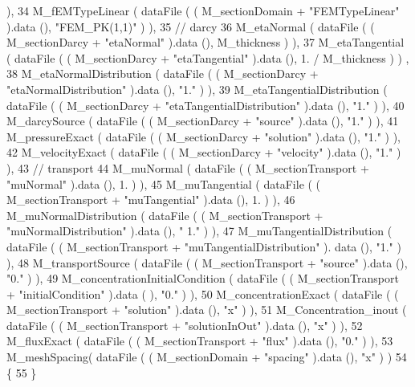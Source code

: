 \begin{DoxyCode}
       ),
34             M\_fEMTypeLinear ( dataFile ( ( M\_sectionDomain + \textcolor{stringliteral}{"FEMTypeLinear"} ).data (), \textcolor{stringliteral}{"FEM\_PK(1,1)"} ) ),
35             \textcolor{comment}{// darcy}
36             M\_etaNormal ( dataFile ( ( M\_sectionDarcy + \textcolor{stringliteral}{"etaNormal"} ).data (), M\_thickness ) ),
37             M\_etaTangential ( dataFile ( ( M\_sectionDarcy + \textcolor{stringliteral}{"etaTangential"} ).data (), 1. / M\_thickness ) )
      ,
38             M\_etaNormalDistribution ( dataFile ( ( M\_sectionDarcy + \textcolor{stringliteral}{"etaNormalDistribution"} ).data (), \textcolor{stringliteral}{"1."}
       ) ),
39             M\_etaTangentialDistribution ( dataFile ( ( M\_sectionDarcy + \textcolor{stringliteral}{"etaTangentialDistribution"} ).data 
      (), \textcolor{stringliteral}{"1."} ) ),
40             M\_darcySource ( dataFile ( ( M\_sectionDarcy + \textcolor{stringliteral}{"source"} ).data (), \textcolor{stringliteral}{"1."} ) ),
41             M\_pressureExact ( dataFile ( ( M\_sectionDarcy + \textcolor{stringliteral}{"solution"} ).data (), \textcolor{stringliteral}{"1."} ) ),
42             M\_velocityExact ( dataFile ( ( M\_sectionDarcy + \textcolor{stringliteral}{"velocity"} ).data (), \textcolor{stringliteral}{"1."} ) ),
43             \textcolor{comment}{// transport}
44             M\_muNormal ( dataFile ( ( M\_sectionTransport + \textcolor{stringliteral}{"muNormal"} ).data (), 1. ) ),
45             M\_muTangential ( dataFile ( ( M\_sectionTransport + \textcolor{stringliteral}{"muTangential"} ).data (), 1. ) ),
46             M\_muNormalDistribution ( dataFile ( ( M\_sectionTransport + \textcolor{stringliteral}{"muNormalDistribution"} ).data (), \textcolor{stringliteral}{"
      1."} ) ),
47             M\_muTangentialDistribution ( dataFile ( ( M\_sectionTransport + \textcolor{stringliteral}{"muTangentialDistribution"} ).
      data (), \textcolor{stringliteral}{"1."} ) ),
48             M\_transportSource ( dataFile ( ( M\_sectionTransport + \textcolor{stringliteral}{"source"} ).data (), \textcolor{stringliteral}{"0."} ) ),
49             M\_concentrationInitialCondition ( dataFile ( ( M\_sectionTransport + \textcolor{stringliteral}{"initialCondition"} ).data (
      ), \textcolor{stringliteral}{"0."} ) ),
50             M\_concentrationExact ( dataFile ( ( M\_sectionTransport + \textcolor{stringliteral}{"solution"} ).data (), \textcolor{stringliteral}{"x"} ) ),
51             M\_Concentration\_inout ( dataFile ( ( M\_sectionTransport + \textcolor{stringliteral}{"solutionInOut"} ).data (), \textcolor{stringliteral}{"x"} ) ),
52             M\_fluxExact ( dataFile ( ( M\_sectionTransport + \textcolor{stringliteral}{"flux"} ).data (), \textcolor{stringliteral}{"0."} ) ),
53             M\_meshSpacing( dataFile ( ( M\_sectionDomain + \textcolor{stringliteral}{"spacing"} ).data (), \textcolor{stringliteral}{"x"} ) )
54 \{
55 \}
\end{DoxyCode}



